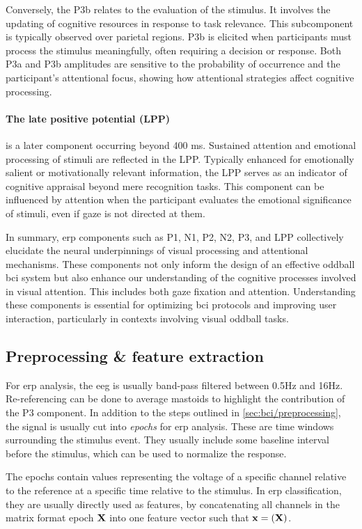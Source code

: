 Conversely, the P3b relates to the evaluation of the stimulus.
It involves the updating of cognitive resources in response to task relevance.
This subcomponent is typically observed over parietal regions.
P3b is elicited when participants must process the stimulus meaningfully, often
requiring a decision or response.
Both P3a and P3b amplitudes are sensitive to the probability of occurrence and the
participant's attentional focus, showing how attentional strategies affect cognitive
processing.

\paragraph{The late positive potential (LPP)} is a later component occurring beyond 400 ms.
Sustained attention and emotional processing of stimuli are reflected in the LPP.
Typically enhanced for emotionally salient or motivationally relevant information, the
LPP serves as an indicator of cognitive appraisal beyond mere recognition tasks.
This component can be influenced by attention when the participant evaluates the
emotional significance of stimuli, even if gaze is not directed at them.

In summary, \ac{erp} components such as P1, N1, P2, N2, P3, and LPP collectively
elucidate the neural underpinnings of visual processing and attentional mechanisms.
These components not only inform the design of an effective oddball \ac{bci} system but
also enhance our understanding of the cognitive processes involved in visual attention.
This includes both gaze fixation and attention.
Understanding these components is essential for optimizing \ac{bci} protocols and
improving user interaction, particularly in contexts involving visual oddball tasks.


\subsection{Preprocessing \& feature extraction}
For \ac{erp} analysis, the \ac{eeg} is usually band-pass filtered between 0.5Hz and
16Hz.
Re-referencing can be done to average mastoids to highlight the contribution of the P3
component.
In addition to the steps outlined in \autoref{sec:bci/preprocessing}, the signal is
usually cut into \emph{epochs} for \ac{erp} analysis.
These are time windows surrounding the stimulus event.
They usually include some baseline interval before the stimulus, which can be used to
normalize the response.

The epochs contain values representing the voltage of a specific channel relative to the
reference at a specific time relative to the stimulus.
In \ac{erp} classification, they are usually directly used as features, by concatenating
all channels in the matrix format epoch $\mathbf{X}$ into one feature vector such that
$\mathbf{x} = \mathbf{(}\mathbf{X})$.

